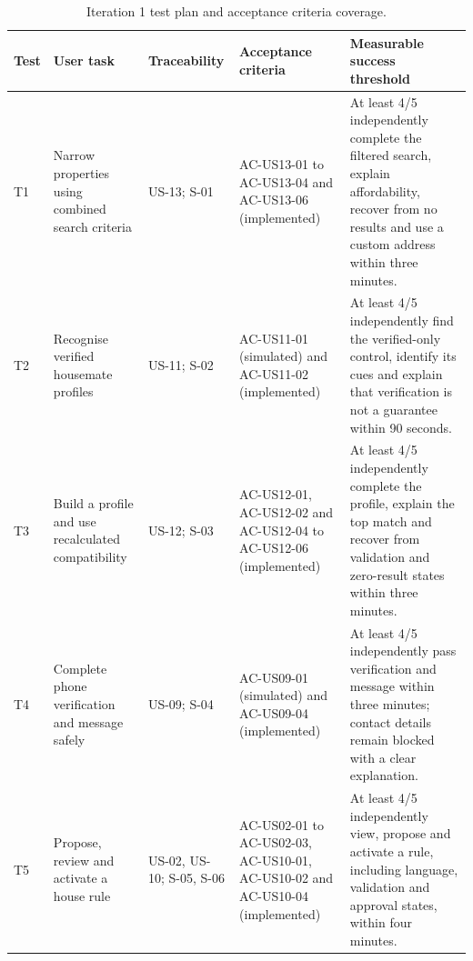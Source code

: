 \documentclass[11pt,a4paper]{article}
\begin{document}
\begin{table}[H]
    \centering
    \footnotesize
    \caption{Iteration 1 test plan and acceptance criteria coverage.}
    \begin{tabularx}{\textwidth}{@{}L{0.7cm}L{2.7cm}L{2.0cm}L{3.3cm}Y@{}}
        \toprule
        Test & User task & Traceability & Acceptance criteria & Measurable success threshold\\
        \midrule
        T1 &
        Narrow properties using combined search criteria &
        US-13; S-01 &
        AC-US13-01 to AC-US13-04 and AC-US13-06 (implemented) &
        At least 4/5 independently complete the filtered search, explain
        affordability, recover from no results and use a custom address within
        three minutes.\\

        T2 &
        Recognise verified housemate profiles &
        US-11; S-02 &
        AC-US11-01 (simulated) and AC-US11-02 (implemented) &
        At least 4/5 independently find the verified-only control, identify its
        cues and explain that verification is not a guarantee within 90 seconds.\\

        T3 &
        Build a profile and use recalculated compatibility &
        US-12; S-03 &
        AC-US12-01, AC-US12-02 and AC-US12-04 to AC-US12-06 (implemented) &
        At least 4/5 independently complete the profile, explain the top match
        and recover from validation and zero-result states within three minutes.\\

        T4 &
        Complete phone verification and message safely &
        US-09; S-04 &
        AC-US09-01 (simulated) and AC-US09-04 (implemented) &
        At least 4/5 independently pass verification and message within three
        minutes; contact details remain blocked with a clear explanation.\\

        T5 &
        Propose, review and activate a house rule &
        US-02, US-10; S-05, S-06 &
        AC-US02-01 to AC-US02-03, AC-US10-01, AC-US10-02 and AC-US10-04
        (implemented) &
        At least 4/5 independently view, propose and activate a rule, including
        language, validation and approval states, within four minutes.\\
        \bottomrule
    \end{tabularx}
    \label{tabiterationoneplan}
\end{table}
\end{document}
